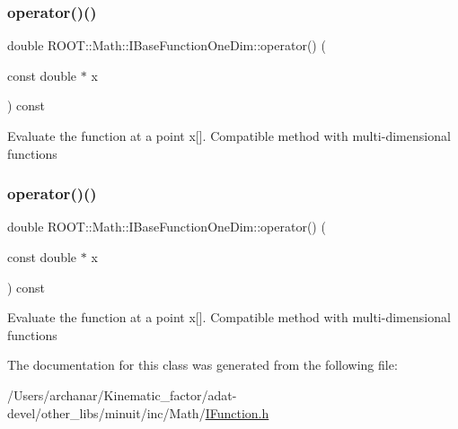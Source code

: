 \subsubsection{\texorpdfstring{operator()()}{operator()()}\hspace{0.1cm}{\footnotesize\ttfamily [5/6]}}
{\footnotesize\ttfamily double R\+O\+O\+T\+::\+Math\+::\+I\+Base\+Function\+One\+Dim\+::operator() (\begin{DoxyParamCaption}\item[{const double $\ast$}]{x }\end{DoxyParamCaption}) const\hspace{0.3cm}{\ttfamily [inline]}}

Evaluate the function at a point x\mbox{[}\mbox{]}. Compatible method with multi-\/dimensional functions \mbox{\label{classROOT_1_1Math_1_1IBaseFunctionOneDim_ab99decfcf98d9b016322ebe85f4bc77a}} 
\subsubsection{\texorpdfstring{operator()()}{operator()()}\hspace{0.1cm}{\footnotesize\ttfamily [6/6]}}
{\footnotesize\ttfamily double R\+O\+O\+T\+::\+Math\+::\+I\+Base\+Function\+One\+Dim\+::operator() (\begin{DoxyParamCaption}\item[{const double $\ast$}]{x }\end{DoxyParamCaption}) const\hspace{0.3cm}{\ttfamily [inline]}}

Evaluate the function at a point x\mbox{[}\mbox{]}. Compatible method with multi-\/dimensional functions 

The documentation for this class was generated from the following file\+:\begin{DoxyCompactItemize}
\item 
/\+Users/archanar/\+Kinematic\+\_\+factor/adat-\/devel/other\+\_\+libs/minuit/inc/\+Math/\mbox{\hyperlink{adat-devel_2other__libs_2minuit_2inc_2Math_2IFunction_8h}{I\+Function.\+h}}\end{DoxyCompactItemize}
